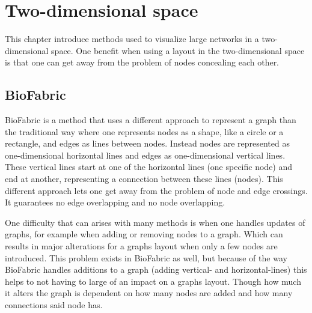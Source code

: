 \documentclass[a4paper,11pt]{kth-mag}
\begin{document}
\section{Two-dimensional space}
This chapter introduce methods used to visualize large networks in a two-dimensional space. One benefit when using a layout in 
the two-dimensional space is that one can get away from the problem of nodes concealing each other. 
\subsection{BioFabric}
BioFabric\cite{23102059} is a method that uses a different approach to represent a graph than the traditional way where one represents nodes
as a shape, like a circle or a rectangle, and edges as lines between nodes. Instead nodes are represented as one-dimensional
horizontal lines and edges as one-dimensional vertical lines. These vertical lines start at one of the horizontal lines (one specific node)
and end at another, representing a connection between these lines (nodes). This different approach lets one get away from the problem of node and edge crossings.
It guarantees no edge overlapping and no node overlapping.

One difficulty that can arises with many methods is when one handles updates of graphs, for example when adding or removing nodes to a graph. Which can results in major alterations for a graphs layout when only a few nodes are introduced. 
This problem exists in BioFabric as well, but because of the way BioFabric handles additions to a graph (adding vertical- and horizontal-lines) this 
helps to not having to large of an impact on a graphs layout. Though how much it alters the graph is dependent on how many nodes are added and how many connections said node has.
\end{document}
